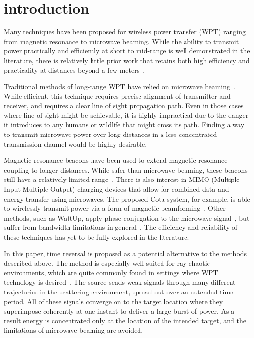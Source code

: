 \section{introduction}
\label{sec:intro}

Many techniques have been proposed for wireless power transfer (WPT)
ranging from magnetic resonance to microwave beaming.
%
While the ability to transmit power practically and efficiently at short to
mid-range is well demonstrated in the literature, there is relatively little
prior work that retains both high efficiency and practicality at distances
beyond a few meters~\cite{wpt-progress}.



Traditional methods of long-range WPT have relied on microwave
beaming~\cite{history-wpt}.
%
While efficient, this technique requires precise alignment of transmitter and
receiver, and requires a clear line of sight propagation path.
%
Even in those cases where line of sight might be achievable, it is highly
impractical due to the danger it introduces to any humans or wildlife that might
cross its path.
%
Finding a way to transmit microwave power over long distances in a less 
concentrated transmission channel would be highly desirable.



Magnetic resonance beacons have been used to extend magnetic resonance coupling
to longer distances.
%
While safer than microwave beaming, these beacons still have a relatively
limited range~\cite{wpt-progress}.
%
There is also interest in MIMO (Multiple Input Multiple Output) charging devices
that allow for combined data and energy transfer using microwaves.
%
The proposed Cota system, for example, is able to wirelessly transmit power via
a form of magnetic-beamforming~\cite{mimo}.
%
Other methods, such as WattUp, apply phase conjugation to the
microwave signal~\cite{wattup}, but suffer from bandwidth
limitations in general~\cite{prada-mirror,derode-mult}.
%
The efficiency and reliability of these techniques has yet to be fully explored
in the literature.



In this paper, time reversal is proposed as a potential alternative to
the methods described above.
%
The method is especially well suited for ray chaotic environments, which are
quite commonly found in settings where WPT technology is desired~\cite{hemmady}.
%
The source sends weak signals through many different trajectories in the
scattering environment, spread out over an extended time period.
%
All of these signals converge on to the target location where they
superimpose coherently at one instant to deliver a large burst of power.
%
As a result energy is concentrated only at the location of the intended target,
and the limitations of microwave beaming are avoided.



